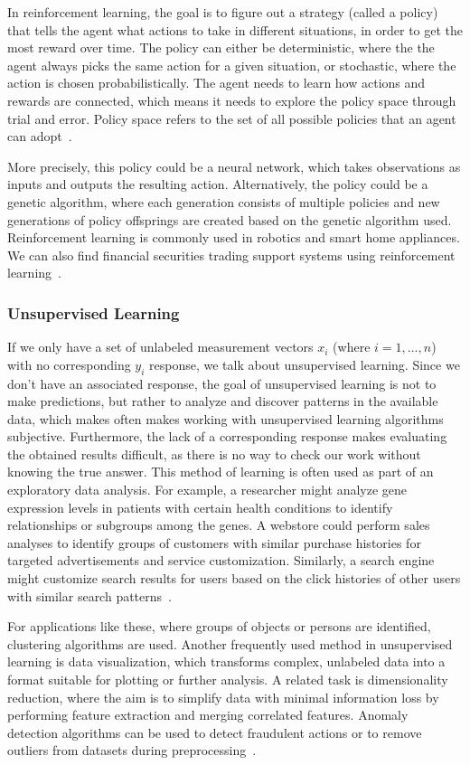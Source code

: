 \documentclass[a4paper,oneside,onecolumn,12pt]{book}
\begin{document}
		In reinforcement learning, the goal is to figure out a strategy (called a policy) that tells the agent what actions to take in different situations, in order to get the most reward over time. The policy can either be deterministic, where the the agent always picks the same action for a given situation, or stochastic, where the action is chosen probabilistically. The agent needs to learn how actions and rewards are connected, which means it needs to explore the policy space through trial and error. Policy space refers to the set of all possible policies that an agent can adopt~\cite{RLRAS}.

		More precisely, this policy could be a neural network, which takes observations as inputs and outputs the resulting action. Alternatively, the policy could be a genetic algorithm, where each generation consists of multiple policies and new generations of policy offsprings are created based on the genetic algorithm used. Reinforcement learning is commonly used in robotics and smart home appliances. We can also find financial securities trading support systems using reinforcement learning~\cite{HMLSKT}.

		\subsubsection{Unsupervised Learning}
		If we only have a set of unlabeled measurement vectors $x_i$ (where $i = 1, ..., n$) with no corresponding $y_i$ response, we talk about unsupervised learning. Since we don't have an associated response, the goal of unsupervised learning is not to make predictions, but rather to analyze and discover patterns in the available data, which makes often makes working with unsupervised learning algorithms subjective. Furthermore, the lack of a corresponding response makes evaluating the obtained results difficult, as there is no way to check our work without knowing the true answer. This method of learning is often used as part of an exploratory data analysis. For example, a researcher might analyze gene expression levels in patients with certain health conditions to identify relationships or subgroups among the genes. A webstore could perform sales analyses to identify groups of customers with similar purchase histories for targeted advertisements and service customization. Similarly, a search engine might customize search results for users based on the click histories of other users with similar search patterns~\cite{AISL}.

		For applications like these, where groups of objects or persons are identified, clustering algorithms are used. Another frequently used method in unsupervised learning is data visualization, which transforms complex, unlabeled data into a format suitable for plotting or further analysis. A related task is dimensionality reduction, where the aim is to simplify data with minimal information loss by performing feature extraction and merging correlated features. Anomaly detection algorithms can be used to detect fraudulent actions or to remove outliers from datasets during preprocessing~\cite{HMLSKT}.
\end{document}
